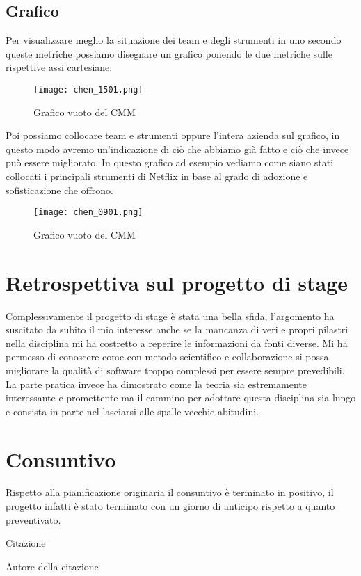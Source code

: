 \subsection{Grafico}
Per visualizzare meglio la situazione dei team e degli strumenti in uno secondo queste metriche possiamo disegnare un grafico ponendo le due metriche sulle rispettive assi cartesiane:
\begin{figure}[h]
    \centering
    \texttt{[image: chen\_1501.png]}
    \caption{Grafico vuoto del CMM}
    \label{tab:grafico-vuoto-cmm}
\end{figure}
Poi possiamo collocare team e strumenti oppure l'intera azienda sul grafico, in questo modo avremo un'indicazione di ciò che abbiamo già fatto e ciò che invece può essere migliorato.
In questo grafico ad esempio vediamo come siano stati collocati i principali strumenti di Netflix in base al grado di adozione e sofisticazione che offrono.
\begin{figure}[h]
    \centering
    \texttt{[image: chen\_0901.png]}
    \caption{Grafico vuoto del CMM}
    \label{tab:grafico-vuoto-cmm}
\end{figure}

\section{Retrospettiva sul progetto di stage}
Complessivamente il progetto di stage è stata una bella sfida, l'argomento ha suscitato da subito il mio interesse anche se la mancanza di veri e propri pilastri nella disciplina mi ha costretto a reperire le informazioni da fonti diverse.
Mi ha permesso di conoscere come con metodo scientifico e collaborazione si possa migliorare la qualità di software troppo complessi per essere sempre prevedibili.
La parte pratica invece ha dimostrato come la teoria sia estremamente interessante e promettente ma il cammino per adottare questa disciplina sia lungo e consista in parte nel lasciarsi alle spalle vecchie abitudini.


\section{Consuntivo}
Rispetto alla pianificazione originaria il consuntivo è terminato in positivo, il progetto infatti è stato terminato con un giorno di anticipo rispetto a quanto preventivato.



\epigraph{Citazione}{Autore della citazione}




